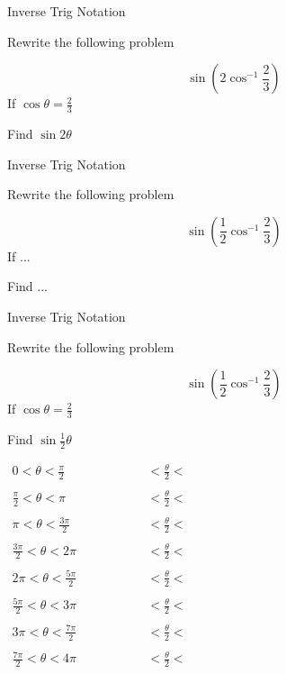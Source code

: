 \documentclass[11pt,xcolor=dvipsnames]{beamer}
\begin{document}
\begin{frame}{Inverse Trig Notation}

Rewrite the following problem

\[ \sin \left (2 \cos^{-1}  \frac{2}{3} \right)\]
\vfill 
If $\cos \theta = \frac{2}{3}$

\bigskip

Find $\sin 2 \theta$
\vfill 

\end{frame}	
	\begin{frame}{Inverse Trig Notation}

Rewrite the following problem

\[ \sin \left (\frac{1}{2} \cos^{-1}  \frac{2}{3} \right)\]
\vfill 
If ...

\bigskip

Find ...
\vfill 

\end{frame}

\begin{frame}{Inverse Trig Notation}

Rewrite the following problem

\[ \sin \left (\frac{1}{2} \cos^{-1}  \frac{2}{3} \right)\]
\vfill 
If $\cos \theta = \frac{2}{3}$

\bigskip

Find $\sin \frac{1}{2} \theta$
\vfill 

\end{frame}	

\begin{frame}

$
\begin{array}{ccc}
0 < \theta < \frac{\pi}{2}&\qquad& \qquad < \frac{\theta}{2} < \; \\
&& \\
\frac{\pi}{2}  < \theta < \pi &\qquad& \qquad < \frac{\theta}{2} < \; \\
&& \\
\pi < \theta < \frac{3\pi}{2}&\qquad& \qquad < \frac{\theta}{2} < \; \\
&& \\
\frac{3\pi}{2}  < \theta < 2\pi &\qquad& \qquad < \frac{\theta}{2} < \; \\
&& \\
2\pi < \theta < \frac{5\pi}{2}&\qquad& \qquad < \frac{\theta}{2} < \; \\
&& \\
\frac{5\pi}{2}  < \theta < 3\pi &\qquad& \qquad < \frac{\theta}{2} < \; \\
&& \\
3\pi < \theta < \frac{7\pi}{2}&\qquad& \qquad < \frac{\theta}{2} < \; \\
&& \\
\frac{7\pi}{2}  < \theta < 4\pi &\qquad& \qquad < \frac{\theta}{2} < \; \\
&& \\
\end{array}
$
\end{frame}
	
\end{document}

